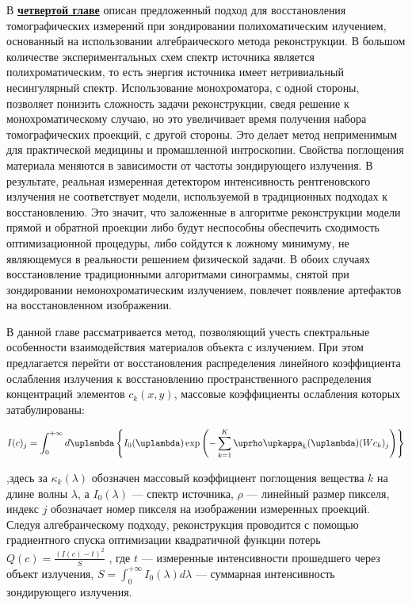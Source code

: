 \vspace{5mm}

В \underline{\textbf{четвертой главе}} описан предложенный подход для восстановления томографических измерений при зондировании полихоматическим илучением, основанный на использовании алгебраического метода реконструкции.
В большом количестве экспериментальных схем спектр источника является полихроматическим, то есть энергия источника имеет нетривиальный несингулярный спектр.
Использование монохроматора, с одной стороны, позволяет понизить сложность задачи реконструкции, сведя решение к монохроматическому случаю, но это увеличивает время получения набора томографических проекций, с другой стороны.
Это делает метод неприменимым для практической медицины и промашленной интроскопии.
Свойства поглощения материала меняются в зависимости от частоты зондирующего излучения.
В результате, реальная измеренная детектором интенсивность рентгеновского излучения не соответствует модели, используемой в традиционных подходах к восстановлению.
Это значит, что заложенные в алгоритме реконструкции модели прямой и обратной проекции либо будут неспособны обеспечить сходимость оптимизационной процедуры, либо сойдутся к ложному минимуму, не являющемуся в реальности решением физической задачи.
В обоих случаях восстановление традиционными алгоритмами синограммы, снятой при зондировании немонохроматическим излучением, повлечет появление артефактов на восстановленном изображении.

В данной главе рассматривается метод, позволяющий учесть спектральные особенности взаимодействия материалов объекта с излучением.
При этом предлагается перейти от восстановления распределения линейного коэффициента ослабления излучения к восстановлению пространственного распределения концентраций элементов $c_k(x,y)$, массовые коэффициенты ослабления которых затабулированы:

\begin{equation} \notag
  \label{eq:white_fp_final}
  I(c)_j = \int_0^{+\infty} {d\lambda \left\{
    I_0(\lambda) \exp{\left(
      -\sum_{k=1}^K {\rho \kappa_k(\lambda) (W c_k)_j} 
      \right)}
  \right\}}
\end{equation}

,здесь за $\kappa_k(\lambda)$ обозначен массовый коэффициент поглощения вещества $k$ на длине волны $\lambda$, а $I_0(\lambda)$ --- спектр источника, $\rho$ --- линейный размер пикселя, индекс $j$ обозначает номер пикселя на изображении измеренных проекций.
Следуя алгебраическому подходу, реконструкция проводится с помощью градиентного спуска оптимизации квадратичной функции потерь 
$
Q(c) = \frac {\left(I(c) - t\right)^2} {S}
$
, где $t$ --- измеренные интенсивности прошедшего через объект излучения, 
$S = \int_0^{+\infty} { I_0(\lambda) d\lambda}$
 --- суммарная интенсивность зондирующего излучения.

